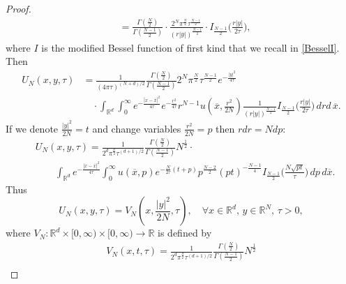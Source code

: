 \documentclass[11pt, twoside, notitlepage]{amsart}
\newcommand\R{\mathbb{R}}
\numberwithin{equation}{section}
\begin{document}
\begin{proof}
\begin{align*}
  &= \frac{\Gamma(\frac{N}{2} )}{\Gamma(\frac{N-1}{2})}  \cdot \frac{ 2^N \pi^{\frac{N}{2} }  \tau^{\frac{N-1}{2}}  }{(r  |y|   ) ^{\frac{N-1}{2}}} \cdot  I_{\frac{N-1}{2}} \Big(\frac{ r  |y|  }{2 \tau} \Big),
\end{align*}
where $I$ is the modified Bessel function of first kind that we recall in \eqref{BesselI}.
Then
\begin{align}\label{radial:U-N}
  U_N(x,y,\tau) & = \frac{1}{(4 \pi \tau)^{(N+d)/2}}
  \frac{\Gamma(\frac{N}{2} )}{\Gamma(\frac{N-1}{2})}   2^N \pi^{\frac{N}{2} }
    \tau^{\frac{N-1}{2}}  e^{ - \frac{ |y|^2 }{4 \tau} }  \\ \nonumber
  &\quad \cdot \int_{\R^d}  \int_0^\infty
   e^{ - \frac{|x-\overline{x}|^2 }{4 \tau} } e^{ - \frac{  r^2}{4 \tau} }  r^{N-1 }u(\overline{x}, \frac{r^2}{2N} ) \frac{ 1 }{(r  |y|   ) ^{\frac{N-1}{2}}}  I_{\frac{N-1}{2}}\Big( \frac{r  |y|  }{2 \tau} \Big) \,d r d \, \overline{x}.
\end{align}
If we denote $\frac{|y|^2 }{2N}=t$  and change variables $\frac{r^2}{2N}=p$  then $r dr=N dp$:
\begin{align*}
 & U_N(x,y,\tau)
   =\frac{1}{ 2^d     \pi^{\frac{d}{2} } \tau^{(d+1)/2}}    \frac{\Gamma(\frac{N}{2} )}{\Gamma(\frac{N-1}{2})}   N^{\frac{1}{2}} \cdot  \\
   & \qquad \int_{\R^d}e^{ - \frac{|x-\overline{x}|^2 }{4 \tau} }  \int_0^\infty u(\overline{x}, p )
      e^{ - \frac{  N }{2 \tau} (t+p)}    p^{\frac{N-2}{2} }  (pt)   ^{ - \frac{N-1}{4}}  I_{\frac{N-1}{2}}\Big(\frac{ N  \sqrt{pt}  }{ \tau} \Big) \, d p\, d \overline{x}.
\end{align*}
Thus $$ U_N(x,y,\tau) = V_N(x,\frac{|y|^2 }{2N},\tau), \quad \forall x  \in \R^d, \, y\in \R^N,\, \tau>0,$$
where $V_N:\R^d \times [0,\infty) \times [0,\infty)\to \R$ is defined by
\begin{multline}
  \label{def:VN}
 V_N(x,t,\tau) = \frac{1}{ 2^d     \pi^{\frac{d}{2} } \tau^{(d+1)/2}}    \frac{\Gamma(\frac{N}{2} )}{\Gamma(\frac{N-1}{2})}   N^{\frac{1}{2}} \\

\end{multline}
\end{proof}
\end{document}
